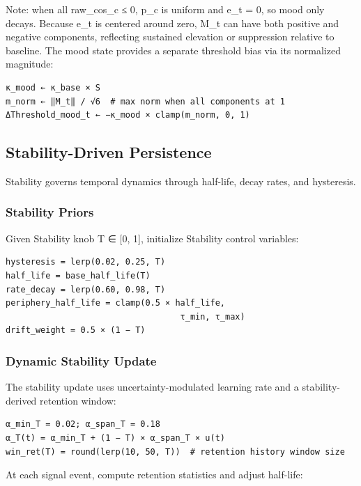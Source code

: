 \documentclass[
  letterpaper,
  DIV=11,
  numbers=noendperiod]{scrartcl}
\begin{document}
Note: when all raw\_cos\_c ≤ 0, p\_c is uniform and e\_t = 0, so mood
only decays. Because e\_t is centered around zero, M\_t can have both
positive and negative components, reflecting sustained elevation or
suppression relative to baseline. The mood state provides a separate
threshold bias via its normalized magnitude:

\begin{verbatim}
κ_mood ← κ_base × S
m_norm ← ‖M_t‖ / √6  # max norm when all components at 1
ΔThreshold_mood_t ← −κ_mood × clamp(m_norm, 0, 1)
\end{verbatim}

\subsection{Stability-Driven
Persistence}\label{stability-driven-persistence}

Stability governs temporal dynamics through half-life, decay rates, and
hysteresis.

\subsubsection{Stability Priors}\label{stability-priors}

Given Stability knob T ∈ {[}0, 1{]}, initialize Stability control
variables:

\begin{verbatim}
hysteresis = lerp(0.02, 0.25, T)
half_life = base_half_life(T)
rate_decay = lerp(0.60, 0.98, T)
periphery_half_life = clamp(0.5 × half_life,
                                   τ_min, τ_max)
drift_weight = 0.5 × (1 − T)
\end{verbatim}

\subsubsection{Dynamic Stability Update}\label{sec-stability-update}

The stability update uses uncertainty-modulated learning rate and a
stability-derived retention window:

\begin{verbatim}
α_min_T = 0.02; α_span_T = 0.18
α_T(t) = α_min_T + (1 − T) × α_span_T × u(t)
win_ret(T) = round(lerp(10, 50, T))  # retention history window size
\end{verbatim}

At each signal event, compute retention statistics and adjust half-life:
\end{document}
